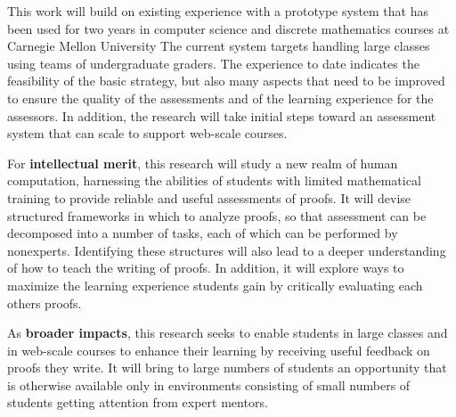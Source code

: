 \documentclass[12pt]{article}
\begin{document}
This work will build on existing experience with a prototype system
that has been used for two years in computer science and discrete
mathematics courses at Carnegie Mellon University The current system
targets handling large classes using teams of undergraduate graders.
The experience to date indicates the feasibility of the basic
strategy, but also many aspects that need to be improved to ensure the
quality of the assessments and of the learning experience for the
assessors.  In addition, the research will take initial steps toward an
assessment system that can scale to support web-scale courses.

For {\bf intellectual merit}, this research will study a new realm of
human computation, harnessing the abilities of students with limited
mathematical training to provide reliable and useful assessments of
proofs.  It will devise structured frameworks in which to analyze
proofs, so that assessment can be decomposed into a number of tasks,
each of which can be performed by nonexperts.  Identifying these
structures will also lead to a deeper understanding of how to teach
the writing of proofs.  In addition, it will explore ways to maximize
the learning experience students gain by critically evaluating each
others proofs.

As {\bf broader impacts}, this research seeks to enable students in
large classes and in web-scale courses to enhance their learning by
receiving useful feedback on proofs they write.  It will bring to
large numbers of students an opportunity that is otherwise available
only in environments consisting of small numbers of students getting
attention from expert mentors.
\end{document}

